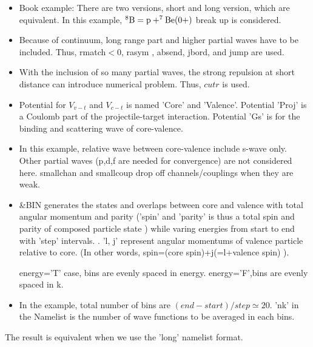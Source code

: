 \documentclass[11pt]{book}
\begin{document}
\begin{itemize}
\item Book example: There are two versions, short and long version, which are equivalent.
      In this example, $^8{\rm B}={\rm p}+^7{\rm Be}(0+)$ break up is considered. 
\item Because of continuum, long range part and higher partial waves have to be included. Thus, rmatch$<0$,  rasym , absend, jbord, and jump  are used. 
\item  With the inclusion of so many partial waves, the strong repulsion at short distance 
can introduce numerical problem. Thus, $cutr$ is used.    
\item Potential for $V_{v-t}$ and $V_{c-t}$ is named 'Core' and 'Valence'. 
      Potential 'Proj' is a Coulomb part of the projectile-target interaction. 
      Potential 'Gs' is for the binding and scattering wave of core-valence. 
\item In this example, relative wave between core-valence include s-wave only. 
      Other partial waves (p,d,f are needed for convergence) are not considered here. 
      smallchan and smallcoup drop off channels/couplings when they are weak.     
\item \&BIN generates the states and overlaps between core and valence 
      with total angular momentum and parity ('spin' and 'parity'
      is thus a total spin and parity of composed particle state
      )
      while varing energies from start to end 
            with 'step' intervals.        .
      'l, j' represent angular momentums of valence particle relative to core. (In other words, spin=(core spin)+j(=l+valence spin) ).
      
      energy='T' case, bins are evenly spaced in energy.
      energy='F',bins are evenly spaced in k.
\item In the example, total number of bins are 
     $(end-start)/step\simeq 20$. 'nk' in the Namelist is the
     number of wave functions to be averaged in each bins. 
          
\end{itemize}
The result is equivalent when we use the 'long' namelist format.
\end{document}
